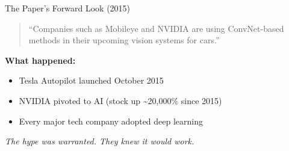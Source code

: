 \begin{frame}{The Paper's Forward Look (2015)}
    \begin{quote}
        ``Companies such as Mobileye and NVIDIA are using ConvNet-based methods in their upcoming vision systems for cars.''
    \end{quote}
    
    \vspace{1em}
    \textbf{What happened:}
    \begin{itemize}
        \item Tesla Autopilot launched October 2015
        \item NVIDIA pivoted to AI (stock up \textasciitilde20,000\% since 2015)
        \item Every major tech company adopted deep learning
    \end{itemize}
    
    \vspace{1em}
    \textit{The hype was warranted. They knew it would work.}
\end{frame}
